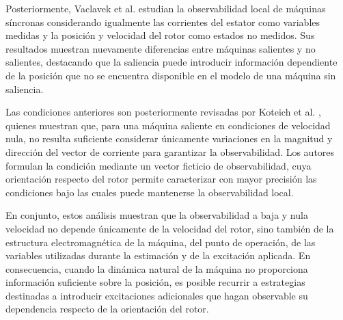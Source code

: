Posteriormente, Vaclavek et al. \cite{vaclavekACDriveObservability2013} estudian la observabilidad local de máquinas síncronas considerando igualmente las corrientes del estator como variables medidas y la posición y velocidad del rotor como estados no medidos. Sus resultados muestran nuevamente diferencias entre máquinas salientes y no salientes, destacando que la saliencia puede introducir información dependiente de la posición que no se encuentra disponible en el modelo de una máquina sin saliencia.

Las condiciones anteriores son posteriormente revisadas por Koteich et al. \cite{koteichDiscussionACDrive2015}, quienes muestran que, para una máquina saliente en condiciones de velocidad nula, no resulta suficiente considerar únicamente variaciones en la magnitud y dirección del vector de corriente para garantizar la observabilidad. Los autores formulan la condición mediante un vector ficticio de observabilidad, cuya orientación respecto del rotor permite caracterizar con mayor precisión las condiciones bajo las cuales puede mantenerse la observabilidad local.

En conjunto, estos análisis muestran que la observabilidad a baja y nula velocidad no depende únicamente de la velocidad del rotor, sino también de la estructura electromagnética de la máquina, del punto de operación, de las variables utilizadas durante la estimación y de la excitación aplicada. En consecuencia, cuando la dinámica natural de la máquina no proporciona información suficiente sobre la posición, es posible recurrir a estrategias destinadas a introducir excitaciones adicionales que hagan observable su dependencia respecto de la orientación del rotor.
%
%
%
%
%
%
%
%

